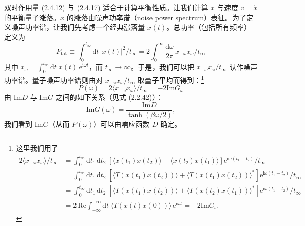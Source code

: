 双时作用量 (2.4.12) 与 (2.4.17) 适合于计算平衡性质。让我们计算 $x$ 与速度 $v = \dot{x}$ 的平衡量子涨落。$x$ 的涨落由噪声功率谱（noise power spectrum）表征。为了定义噪声功率谱，让我们先考虑一个经典涨落量 $x(t)$。总功率（包括所有频率）定义为
\begin{equation*}
P_{\mathrm{tot}} \equiv \int_0^{t_\infty} \mathrm{d}t\,|x(t)|^2/t_\infty = 2\int_0^{\infty} \frac{\mathrm{d}\omega}{2\pi}\,x_{-\omega}x_{\omega}/t_\infty
\end{equation*}
其中 $x_\omega = \int_0^{t_\infty} \mathrm{d}t\;x(t)\,\mathrm{e}^{\mathrm{i}\omega t}$，而 $t_\infty \to \infty$。于是，我们可以把 $x_{-\omega}x_\omega/t_\infty$ 认作噪声功率谱。量子噪声功率谱则由对 $x_{-\omega}x_\omega/t_\infty$ 取量子平均而得到：\footnote{这里我们用了
\begin{align*}
2\langle x_{-\omega}x_\omega\rangle/t_\infty &= \int_0^{t_\infty} \mathrm{d}t_1\,\mathrm{d}t_2\;\left[\langle x(t_1)x(t_2)\rangle + \langle x(t_2)x(t_1)\rangle\right]\mathrm{e}^{\mathrm{i}\omega(t_1 - t_2)}/t_\infty\\
&= \int_0^{t_\infty} \mathrm{d}t_1\,\mathrm{d}t_2\;\left[\langle T(x(t_1)x(t_2))\rangle + \langle T(x(t_1)x(t_2))\rangle^{*}\right]\mathrm{e}^{\mathrm{i}\omega(t_1 - t_2)}/t_\infty\\
&= \int_0^{t_\infty} \mathrm{d}t_1\,\mathrm{d}t_2\;\left[\langle T(x(t_1)x(t_2))\rangle + \langle T(x(t_2)x(t_1))\rangle^{*}\right]\mathrm{e}^{\mathrm{i}\omega(t_1 - t_2)}/t_\infty\\
&= 2\,\mathrm{Re}\int_{-\infty}^{+\infty} \mathrm{d}t\;\langle T(x(t)x(0))\rangle\,\mathrm{e}^{\mathrm{i}\omega t} = -2\mathrm{Im}G_\omega
\end{align*}}
\begin{equation*}
P(\omega) = 2\langle x_{-\omega}x_\omega\rangle/t_\infty = -2\mathrm{Im}G_\omega \tag{2.4.19}
\end{equation*}
由 $\mathrm{Im}D$ 与 $\mathrm{Im}G$ 之间的如下关系（见式 (2.2.42)）：
\begin{equation*}
\mathrm{Im}G(\omega) = \frac{\mathrm{Im}D}{\tanh(\beta\omega/2)}, \tag{2.4.20}
\end{equation*}
我们看到 $\mathrm{Im}G$（从而 $P(\omega)$）可以由响应函数 $D$ 确定。

